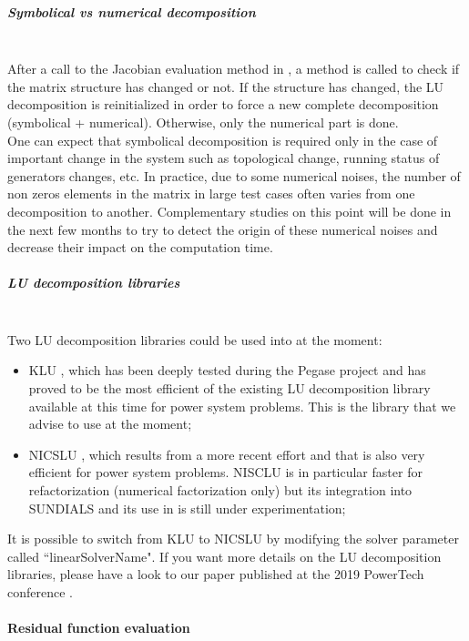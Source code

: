 \documentclass[a4paper, 12pt]{report}
\begin{document}
\subparagraph{Symbolical vs numerical decomposition}
~~\\

After a call to the Jacobian evaluation method in \Dynawo, a method is called to check if the matrix structure has changed or not. If the structure has changed, the LU decomposition is reinitialized in order to force a new complete decomposition (symbolical + numerical). Otherwise, only the numerical part is done.  \\

One can expect that symbolical decomposition is required only in the case of important change in the system such as topological change, running status of generators changes, etc. In practice, due to some numerical noises, the number of non zeros elements in the matrix in large test cases often varies from one decomposition to another. Complementary studies on this point will be done in the next few months to try to detect the origin of these numerical noises and decrease their impact on the computation time.

\subparagraph{LU decomposition libraries}
~~\\

Two LU decomposition libraries could be used into \Dynawo   at the moment:
\begin{itemize}
\item KLU \cite{DavisKLU}, which has been deeply tested during the Pegase project and has proved to be the most efficient of the existing LU decomposition library available at this time for power system problems. This is the library that we advise to use at the moment;
\item NICSLU \cite{chenNicsLu}, which results from a more recent effort and that is also very efficient for power system problems. NISCLU is in particular faster for refactorization (numerical factorization only) but its integration into \ac{SUNDIALS} and its use in \Dynawo is still under experimentation;
\end{itemize}

It is possible to switch from KLU to NICSLU by modifying the solver parameter called ``linearSolverName". If you want more details on the LU decomposition libraries, please have a look to our paper published at the 2019 PowerTech conference \cite{LUDecomposition}.

\paragraph{Residual function evaluation}
~~\\
\end{document}

